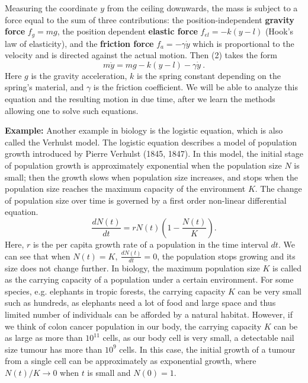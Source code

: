\documentclass[11pt,a4paper,twoside]{article}
\begin{document}
	Measuring the coordinate $y$ from the ceiling downwards, the mass is subject to a force
	equal to the sum of three contributions: the position-independent \textbf{gravity force} $f_g = mg$, the position dependent \textbf{elastic force} $f_{el} = −k(y − l)$ (Hook’s law of elasticity), and the \textbf{friction force} $f_a = - \gamma \dot{y}$ which is proportional to the velocity and is directed against the actual motion. Then (2) takes the form
	\begin{equation}
			m\ddot{y} = mg - k(y-l)-\gamma \dot{y}\ .
	\end{equation}
	Here $g$ is the gravity acceleration, $k$ is the spring constant depending on the spring’s material, and $\gamma$ is the friction coefficient. We will be able to analyze this equation and the resulting motion in due time, after we learn the methods allowing one to solve such equations.\par
	\textbf{Example:}
	Another example in biology is the logistic equation, which is also called the Verhulst model. The logistic equation describes a model of population growth introduced by Pierre Verhulst (1845, 1847). In this model, the initial stage of population growth is approximately exponential when the population size $N$ is small; then the growth slows when population size increases, and stops when the population size reaches the maximum capacity of the environment $K$. The change of population size over time is governed by a first order non-linear differential equation.
	\begin{equation}
			\frac{dN(t)}{dt} = rN(t)(1-\frac{N(t)}{K}).
	\end{equation}
	Here, $r$ is the per capita growth rate of a population in the time interval $dt$. We can see that when $N(t) = K,\ \frac{dN(t)}{dt} = 0$, the population stops growing and its size does not change further. In biology, the maximum population size $K$ is called as the carrying capacity of a population under a certain environment. For some species, e.g. elephants in tropic forests, the carrying capacity $K$ can be very small such as hundreds, as elephants need a lot of food and large space and thus limited number of individuals can be afforded by a natural habitat. However, if we think of colon cancer population in our body, the carrying capacity $K$ can be as large as more than $10^11$ cells, as our body cell is very small, a detectable nail size tumour has more than $10^9$ cells. In this case, the initial growth of a tumour from a single cell can be approximately as exponential growth, where $N(t)/K \to 0$ when $t$ is small and $N(0) = 1$.
\end{document}
